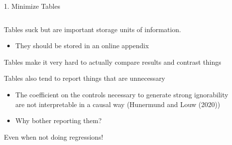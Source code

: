 \documentclass[notes,11pt, aspectratio=169]{beamer}
\newenvironment{wideitemize}{\itemize\addtolength{\itemsep}{10pt}}{\enditemize}
\begin{document}
\begin{frame}{1. Minimize Tables}
  \begin{columns}[T] %
    \begin{column}{.6\textwidth}
      \begin{wideitemize}
      \item Tables suck but are important storage units of
        information.
        \begin{itemize}
        \item They should be stored in an online appendix
        \end{itemize}
      \item Tables make it very hard to actually compare results and contrast things
      \item Tables also tend to report things that are unnecessary
        \begin{itemize}
        \item The coefficient on the controls necessary to generate
          strong ignorability are not interpretable in a causal way (Hunermund and Louw (2020))
        \item Why bother reporting them?
        \end{itemize}
      \item Even when not doing regressions!
      \end{wideitemize}
  \end{column}%
  \hfill%
  \begin{column}{.4\textwidth}
  \end{column}
\end{columns}
\end{frame}
\end{document}
